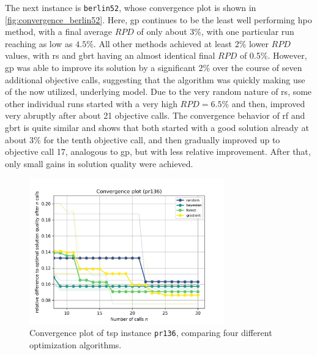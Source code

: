 The next instance is \texttt{berlin52}, whose convergence plot is shown in \cref{fig:convergence_berlin52}. Here, \gls{gp} continues to be the least well performing \gls{hpo} method, with a final average $RPD$ of only about 3\%, with one particular run reaching as low as $4.5\%$. All other methods achieved at least 2\% lower $RPD$ values, with \gls{rs} and \gls{gbrt} having an almost identical final $RPD$ of 0.5\%. 
However, \gls{gp} was able to improve its solution by a significant 2\% over the course of seven additional objective calls, suggesting that the algorithm was quickly making use of the now utilized, underlying model.
Due to the very random nature of \gls{rs}, some other individual runs started with a very high $RPD = 6.5\%$ and then, improved very abruptly after about 21 objective calls. The convergence behavior of \gls{rf} and \gls{gbrt} is quite similar and shows that both started with a good solution already at about 3\% for the tenth objective call, and then gradually improved up to objective call 17, analogous to \gls{gp}, but with less relative improvement. After that, only small gains in solution quality were achieved.

\begin{figure}[h]
	\centering
	\includegraphics[width=0.75\textwidth]{results/part1/convergence_pr136.png}
	\caption[Convergence plot of \gls{tsp} instance \texttt{pr136}]{Convergence plot of \gls{tsp} instance \texttt{pr136}, comparing four different optimization algorithms.}
	\label{fig:convergence_pr136}
\end{figure}

